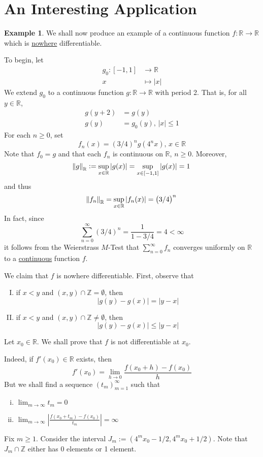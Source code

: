 \documentclass[11pt]{article}
\theoremstyle{definition}
\newtheorem{exmp}[thm]{Example}
\newcommand{\mbZ}{\ensuremath{\mathbb{Z}}}
\newcommand{\mbR}{\ensuremath{\mathbb{R}}}
\begin{document}
\newpage

\section{An Interesting Application}

\begin{exmp}
We shall now produce an example of a continuous function $f : \mbR \to \mbR$ which is \underline{nowhere} differentiable.

To begin, let
\begin{align*}
g_0 : [-1, 1] & \to \mbR \\
x & \mapsto |x|
\end{align*}
We extend $g_0$ to a continuous function $g : \mbR \to \mbR$ with period 2. That is, for all $y \in \mbR$,
\begin{align*}
g(y + 2) & = g(y) \\
g(y) & = g_0(y), \, |x| \leq 1
\end{align*}
For each $n \geq 0$, set
$$f_n(x) = \left(3/4 \right)^n g(4^nx), \, x \in \mbR$$
Note that $f_0 = g$ and that each $f_n$ is continuous on $\mbR$, $n \geq 0$. Moreover,
$$\norm{g}_\mbR := \sup_{x\in\mbR} |g(x)| = \sup_{x\in[-1, 1]} |g(x)| = 1$$
and thus
$$\norm{f_n}_\mbR = \sup_{x\in\mbR} |f_n(x)| = \left(3/4\right)^n$$
In fact, since
$$\sum_{n=0}^\infty \left(3/4\right)^n = \frac{1}{1 - 3/4} = 4 < \infty$$
it follows from the Weierstrass $M$-Test that $\sum_{n=0}^\infty f_n$ converges uniformly on $\mbR$ to a \underline{continuous} function $f$. 

We claim that $f$ is nowhere differentiable. First, observe that
\begin{enumerate}[(I)] 
\item if $x < y$ and $(x, y) \cap \mbZ = \emptyset$, then
$$|g(y) - g(x)| = |y - x|$$
\item if $x < y$ and $(x, y) \cap \mbZ \ne \emptyset$, then
$$|g(y) - g(x)| \leq |y - x|$$
\end{enumerate}
Let $x_0 \in \mbR$. We shall prove that $f$ is not differentiable at $x_0$.

Indeed, if $f'(x_0) \in \mbR$ exists, then
$$f'(x_0) = \lim_{h\to0} \frac{f(x_0+h) - f(x_0)}h$$
But we shall find a sequence $(t_m)_{m=1}^\infty$ such that
\begin{enumerate}[(i)]
\item $\displaystyle\lim_{m\to\infty} t_m = 0$
\item $\displaystyle\lim_{m\to\infty} \left| \frac{f(x_0 + t_m) - f(x_0)}{t_m} \right| = \infty$
\end{enumerate}
Fix $m \geq 1$. Consider the interval $J_m := (4^m x_0 - 1/2, 4^m x_0 + 1/2)$. Note that $J_m \cap \mbZ$ either has 0 elements or 1 element.


\end{exmp}
\end{document}
